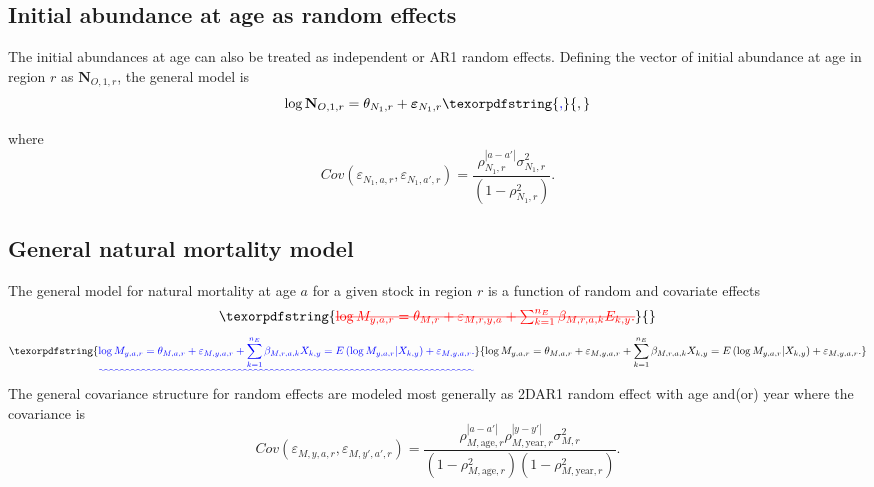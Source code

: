 \documentclass[
]{article}
\makeatletter
\providecommand{\DIFaddtex}[1]{{\protect\color{blue}\uwave{#1}}} %
\providecommand{\DIFdeltex}[1]{{\protect\color{red}\sout{#1}}} %
\providecommand{\DIFaddbegin}{} %
\providecommand{\DIFaddend}{} %
\providecommand{\DIFdelbegin}{} %
\providecommand{\DIFdelend}{} %
\providecommand{\DIFadd}[1]{\texorpdfstring{\DIFaddtex{#1}}{#1}} %
\providecommand{\DIFdel}[1]{\texorpdfstring{\DIFdeltex{#1}}{}} %
\newcommand{\DIFscaledelfig}{0.5}
\newlength{\DIFdelgraphicswidth} %
\newlength{\DIFdelgraphicsheight} %
\newcommand{\DIFaddincludegraphics}[2][]{{\color{blue}\fbox{\DIFOincludegraphics[#1]{#2}}}} %
\newcommand{\DIFdelincludegraphics}[2][]{%
\sbox{\DIFdelgraphicsbox}{\DIFOincludegraphics[#1]{#2}}%
\settoboxwidth{\DIFdelgraphicswidth}{\DIFdelgraphicsbox} %
\settoboxtotalheight{\DIFdelgraphicsheight}{\DIFdelgraphicsbox} %
\scalebox{\DIFscaledelfig}{%
\parbox[b]{\DIFdelgraphicswidth}{\usebox{\DIFdelgraphicsbox}\\[-\baselineskip] \rule{\DIFdelgraphicswidth}{0em}}\llap{\resizebox{\DIFdelgraphicswidth}{\DIFdelgraphicsheight}{%
\setlength{\unitlength}{\DIFdelgraphicswidth}%
\begin{picture}(1,1)%
\thicklines\linethickness{2pt} %
{\color[rgb]{1,0,0}\put(0,0){\framebox(1,1){}}}%
{\color[rgb]{1,0,0}\put(0,0){\line( 1,1){1}}}%
{\color[rgb]{1,0,0}\put(0,1){\line(1,-1){1}}}%
\end{picture}%
}\hspace*{3pt}}} %
} %
\DeclareRobustCommand{\DIFaddbegin}{\DIFOaddbegin \let\includegraphics\DIFaddincludegraphics} %
\DeclareRobustCommand{\DIFaddend}{\DIFOaddend \let\includegraphics\DIFOincludegraphics} %
\DeclareRobustCommand{\DIFdelbegin}{\DIFOdelbegin \let\includegraphics\DIFdelincludegraphics} %
\DeclareRobustCommand{\DIFdelend}{\DIFOaddend \let\includegraphics\DIFOincludegraphics} %
\let\sout@orig\sout %
\renewcommand{\sout}[1]{\ifmmode\text{\sout@orig{\ensuremath{#1}}}\else\sout@orig{#1}\fi} %
\makeatother
\begin{document}
\hypertarget{initial-abundance-at-age-as-random-effects}{%
\subsection*{Initial abundance at age as random effects}\label{initial-abundance-at-age-as-random-effects}}

The initial abundances at age can also be treated as independent or AR1 random effects. Defining the vector of initial abundance at age in region \(r\) as \(\mathbf{N}_{O,1,r}\), the general model is
\begin{equation*}
\log \mathbf{N}_{O,1,r} = \theta_{N_1,r} + \boldsymbol{\varepsilon}_{N_1,r}\DIFaddbegin \DIFadd{,
}\DIFaddend \end{equation*}
where
\begin{equation*}
Cov\left(\varepsilon_{N_1,a,r},\varepsilon_{N_1,a',r}\right) = \frac{\rho_{N_1,r}^{|a-a'|}\sigma^2_{N_1,r}}{\left(1-\rho_{N_1,r}^2\right)}.
\end{equation*}

\hypertarget{general-natural-mortality-model}{%
\subsection*{General natural mortality model}\label{general-natural-mortality-model}}

The general model for natural mortality at age \(a\) for a given stock in region \(r\) is a function of random and covariate effects
\DIFdelbegin \begin{displaymath}
  \DIFdel{\log M_{y,a,r} = \theta_{M,r} + \varepsilon_{M,r,y,a} + \sum^{n_E}_{k=1} \beta_{M,r,a,k} E_{k,y}.
}\end{displaymath}%
\DIFdelend \DIFaddbegin \begin{equation}\DIFadd{\label{eq:M_model}
  \log M_{y,a,r} = \theta_{M,a,r} + \varepsilon_{M,y,a,r} + \sum^{n_E}_{k=1} \beta_{M,r,a,k} X_{k,y} = E\left(\log M_{y,a,r}|X_{k,y}\right) + \varepsilon_{M,y,a,r}.
}\end{equation}\DIFaddend 
The general covariance structure for random effects are modeled most generally as 2DAR1 random effect with age and(or) year where the covariance is
\begin{equation*}
  Cov\left(\varepsilon_{M,y,a,r},\varepsilon_{M,y',a',r}\right) =   \frac{\rho_{M,\text{age},r}^{|a-a'|}\rho_{M,\text{year},r}^{|y-y'|}\sigma^2_{M,r}}{\left(1 -  \rho_{M,\text{age},r}^2\right)\left(1 - \rho_{M,\text{year},r}^2\right)}.
\end{equation*}
\end{document}
